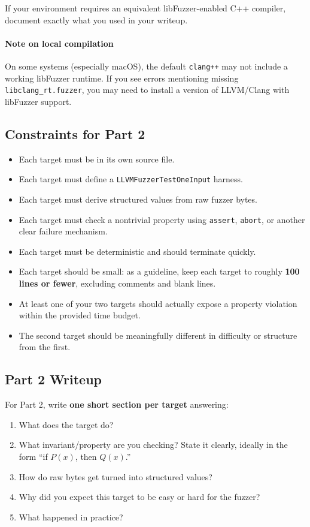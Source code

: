 \documentclass[11pt]{article}
\begin{document}
If your environment requires an equivalent libFuzzer-enabled C++ compiler, document exactly what you used in your writeup.

\paragraph{Note on local compilation}
On some systems (especially macOS), the default \texttt{clang++} may not include a working libFuzzer runtime. If you see errors mentioning missing \texttt{libclang\_rt.fuzzer}, you may need to install a version of LLVM/Clang with libFuzzer support.

\subsection*{Constraints for Part 2}
\begin{itemize}
    \item Each target must be in its own source file.
    \item Each target must define a \texttt{LLVMFuzzerTestOneInput} harness.
    \item Each target must derive structured values from raw fuzzer bytes.
    \item Each target must check a nontrivial property using \texttt{assert}, \texttt{abort}, or another clear failure mechanism.
    \item Each target must be deterministic and should terminate quickly.
    \item Each target should be small: as a guideline, keep each target to roughly \textbf{100 lines or fewer}, excluding comments and blank lines.
    \item At least one of your two targets should actually expose a property violation within the provided time budget.
    \item The second target should be meaningfully different in difficulty or structure from the first.
\end{itemize}

\subsection*{Part 2 Writeup}
For Part 2, write \textbf{one short section per target} answering:
\begin{enumerate}
    \item What does the target do?
    \item What invariant/property are you checking? State it clearly, ideally in the form ``if \(P(x)\), then \(Q(x)\).''
    \item How do raw bytes get turned into structured values?
    \item Why did you expect this target to be easy or hard for the fuzzer?
    \item What happened in practice?
\end{enumerate}
\end{document}
